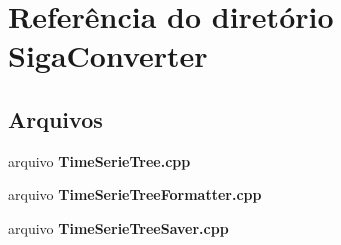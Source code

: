 \section{Referência do diretório Siga\+Converter}
\label{dir_17fe12a6ca2a653267be329c43a2d86d}
\subsection*{Arquivos}
\begin{DoxyCompactItemize}
\item 
arquivo {\bf Time\+Serie\+Tree.\+cpp}
\item 
arquivo {\bf Time\+Serie\+Tree\+Formatter.\+cpp}
\item 
arquivo {\bf Time\+Serie\+Tree\+Saver.\+cpp}
\end{DoxyCompactItemize}
